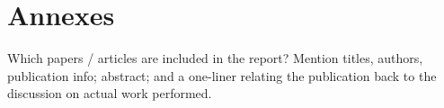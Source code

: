 \documentclass[a4paper,11pt,pdf]{pacmanreport}
\begin{document}


\section{Annexes}

Which papers / articles are included in the report? Mention titles, authors, publication info; abstract; and a one-liner relating the publication back to the discussion on actual work performed.




\end{document}
